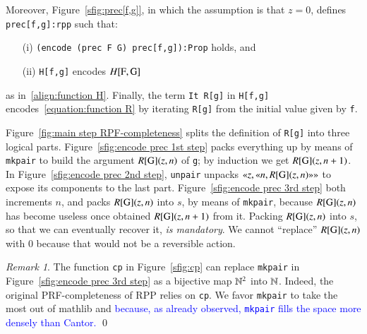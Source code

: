 \documentclass[preprint]{elsarticle}
\theoremstyle{remark}
\newtheorem{remark}{Remark}
\newcommand{\RPP}{\textsf{RPP}\xspace}
\newcommand{\PRF}{\textsf{PRF}\xspace}
\newcommand{\MATHLIB}{\textsf{mathlib}\xspace}
\begin{document}
Moreover, Figure~\ref{sfig:prec[f,g]}, in which the assumption is that $ z = 0 $, defines \lstinline|prec[f,g]:rpp| such that:
\begin{enumerate}
    \item[(i)]
    \lstinline|(encode (prec F G) prec[f,g]):Prop| holds, and
    \item [(ii)]
    \lstinline|H[f,g]| encodes $ H[\mbox{\lstinline|F|},\mbox{\lstinline|G|}]$
\end{enumerate}
as in~\eqref{align:function H}.
Finally, the term \lstinline|It R[g]| in \lstinline|H[f,g]| encodes~\eqref{equation:function R} by iterating \lstinline|R[g]| from the initial value given by \lstinline|f|.

Figure~\ref{fig:main step RPF-completeness} splits the definition of \lstinline|R[g]| into three logical parts.
Figure~\ref{sfig:encode prec 1st step} packs everything up by means of \lstinline|mkpair| to build the argument $ R[\mbox{\lstinline|G|}](z,n) $ of \lstinline|g|; by induction we get
$ R[\mbox{\lstinline|G|}](z,n+1) $.
In Figure~\ref{sfig:encode prec 2nd step}, \lstinline|unpair| unpacks $ \gl z, \gl n, R[\mbox{\lstinline|G|}](z,n) \gr \gr $ to expose its components to the last part.
Figure~\ref{sfig:encode prec 3rd step} both increments $ n $, and packs $ R[\mbox{\lstinline|G|}](z,n) $ into $ s $, by means of \lstinline|mkpair|, because $ R[\mbox{\lstinline|G|}](z,n) $ has become useless once obtained $ R[\mbox{\lstinline|G|}](z,n+1) $ from it. Packing $ R[\mbox{\lstinline|G|}](z,n) $ into $ s $, so that we can eventually recover it, \emph{is mandatory}. We cannot ``replace'' $ R[\mbox{\lstinline|G|}](z,n) $ with $ 0 $ because that would not be a reversible action.

\begin{remark}
The function \lstinline|cp| in Figure~\ref{sfig:cp} can replace \lstinline|mkpair| in Figure~\ref{sfig:encode prec 3rd step} as a bijective map $ \mathbb{N}^2$ into $\mathbb{N}$. Indeed, the original \PRF-completeness of \RPP relies on \lstinline|cp|. We favor \lstinline|mkpair| to take the most out of \MATHLIB and \textcolor{blue}{because, as already observed, \lstinline|mkpair| fills the space more densely than Cantor.}
\qed
\end{remark}
\end{document}
